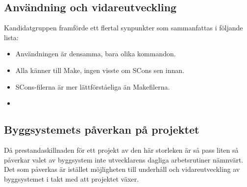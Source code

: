 \FloatBarrier

\subsection{Användning och vidareutveckling}
Kandidatgruppen framförde ett flertal synpunkter som sammanfattas i följande lista:

\begin{itemize}
  \item Användningen är densamma, bara olika kommandon.
  \item Alla känner till Make, ingen visste om SCons sen innan.
  \item SCons-filerna är mer lättförståeliga än Makefilerna.
  \item {}
\end{itemize}

\subsection{Byggsystemets påverkan på projektet}
Då prestandaskillnaden för ett projekt av den här storleken är så pass liten så påverkar valet av byggsystem inte utvecklarens dagliga arbetsrutiner nämnvärt. Det som påverkas är istället möjligheten till underhåll och vidareutveckling av byggsystemet i takt med att projektet växer. 
